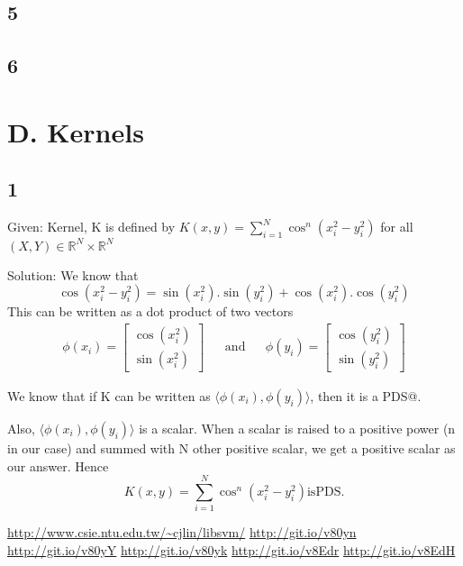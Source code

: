 \documentclass{article}
\begin{document}

\subsection*{5}
\subsection*{6}

\section*{D. Kernels}
\subsection*{1}
\begin{description}
  \item{Given:} Kernel, K is defined by \(K(x,y) = \sum_{i=1}^{N} \cos^{n} (x_{i}^{2} - y_{i}^{2} )\) for all \((X, Y) \in \mathbb{R}^{N} \times \mathbb{R}^{N} \) 
  \item{Solution:}  We know that
    \begin{equation}
      \cos (x_{i}^{2} - y_{i}^{2}) = \sin (x_{i}^{2}).\sin (y_{i}^{2}) + \cos (x_{i}^{2}).\cos (y_{i}^{2})
    \end{equation}
    This can be written as a dot product of two vectors 
    \begin{align}
    \phi(x_{i}) = \begin{bmatrix} \cos (x_{i}^{2}) \\ \sin (x_{i}^{2}) \end{bmatrix} && \mathrm{and} &&
    \phi(y_{i}) = \begin{bmatrix} \cos (y_{i}^{2}) \\ \sin (y_{i}^{2}) \end{bmatrix}
    \end{align}

    We know that if K can be written as \( \langle \phi(x_{i}), \phi(y_{i}) \rangle \), then it is a PDS@.

    Also, \( \langle \phi(x_{i}), \phi(y_{i}) \rangle \) is a scalar.  When a scalar is raised to a positive power (n in our case) and summed with N other positive scalar, we get a positive scalar as our answer.  Hence
    \begin{equation*}
      K(x,y) = \sum_{i=1}^{N} \cos^{n} (x_{i}^{2} - y_{i}^{2} ) \mathrm{is PDS.}
    \end{equation*}
\end{description}

\begin{thebibliography}{1}
   \url{http://www.csie.ntu.edu.tw/~cjlin/libsvm/}
   \url{http://git.io/v80yn}
   \url{http://git.io/v80yY}
   \url{http://git.io/v80yk}
   \url{http://git.io/v8Edr}
   \url{http://git.io/v8EdH}
\end{thebibliography}
\end{document}
